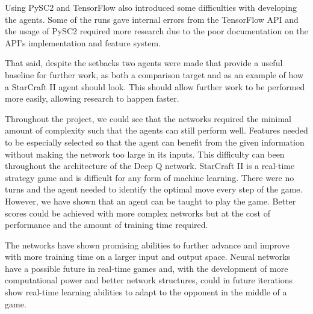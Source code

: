 Using PySC2 and TensorFlow also introduced some difficulties with developing the
agents. Some of the runs gave internal errors from the TensorFlow API and the
usage of PySC2 required more research due to the poor documentation on the API's
implementation and feature system.

That said, despite the setbacks two agents were made that provide a useful
baseline for further work, as both a comparison target and as an example of how
a StarCraft II agent should look. This should allow further work to be performed
more easily, allowing research to happen faster.

Throughout the project, we could see that the networks required the minimal
amount of complexity such that the agents can still perform well. Features
needed to be especially selected so that the agent can benefit from the given
information without making the network too large in its inputs. This difficulty
can been throughout the architecture of the Deep Q network. StarCraft II is a
real-time strategy game and is difficult for any form of machine learning. There
were no turns and the agent needed to identify the optimal move every step of
the game. However, we have shown that an agent can be taught to play the game.
Better scores could be achieved with more complex networks but at the cost of
performance and the amount of training time required.

The networks have shown promising abilities to further advance and improve with
more training time on a larger input and output space. Neural networks have a
possible future in real-time games and, with the development of more
computational power and better network structures, could in future iterations
show real-time learning abilities to adapt to the opponent in the middle of a
game.
